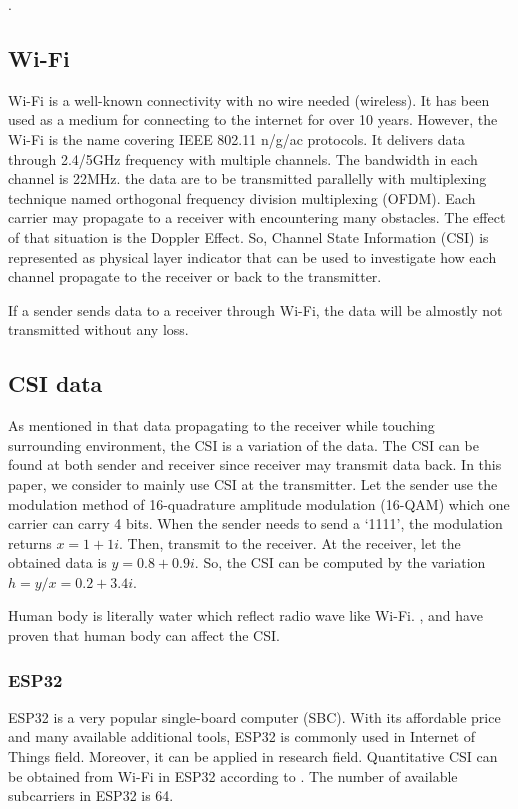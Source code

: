 \documentclass[10pt,letterpaper]{article}
\begin{document}
	.
	
	
	\subsection*{Wi-Fi}\label{wifi}
	
	Wi-Fi is a well-known connectivity with no wire needed (wireless). It has been used as a medium for connecting to the internet for over 10 years. However, the Wi-Fi is the name covering IEEE 802.11 n/g/ac protocols. It delivers data through 2.4/5GHz frequency with multiple channels. The bandwidth in each channel is 22MHz. the data are to be transmitted  parallelly with multiplexing technique named orthogonal frequency division multiplexing (OFDM). Each carrier may propagate to a receiver with encountering many obstacles. The effect of that situation is the Doppler Effect.
	So, Channel State Information (CSI) is represented as physical layer indicator that can be used to investigate how each channel propagate to the receiver or back to the transmitter.
	
	If a sender sends data to a receiver through Wi-Fi, the data will be almostly not transmitted without any loss.
	
	
	
	\subsection*{CSI data}\label{CSI}
	As mentioned in  that data propagating to the receiver while touching surrounding environment, the CSI is a variation of the data. The CSI can  be found at both sender and receiver since receiver may transmit data back. In this paper, we consider to mainly use CSI at the transmitter. Let the sender use the modulation method of 16-quadrature amplitude modulation (16-QAM) which one carrier can carry 4 bits. When the sender needs to send a `1111', the modulation returns $x=1+1i$. Then, transmit to the receiver. At the receiver, let the obtained data is $y=0.8+0.9i$. So, the CSI can be computed by the variation $h=y/x=0.2+3.4i$.
	
	Human body is literally water which reflect radio wave like Wi-Fi. \cite{wangF}, \cite{liuJ} and \cite{chowdhuryTZ} have proven that human body can affect the CSI.
	
	\subsubsection*{ESP32}\label{ESP32}
	ESP32 is a very popular single-board computer (SBC). With its affordable price and many available additional tools, ESP32 is commonly used in Internet of Things field. Moreover, it can be applied in research field. Quantitative CSI can be obtained from Wi-Fi in ESP32 according to \cite{atifM}. The number of available subcarriers in ESP32 is 64.
	
\end{document}
